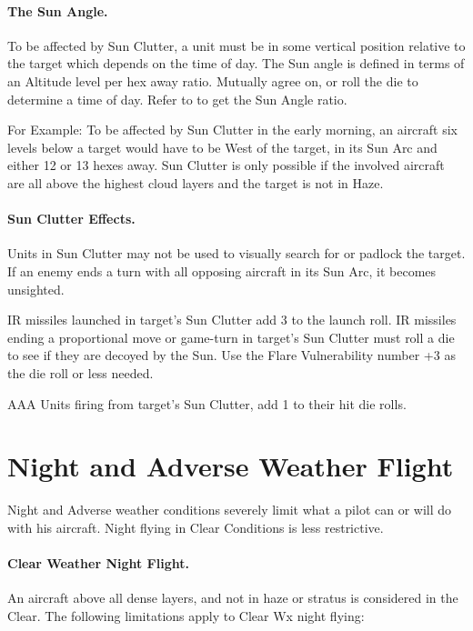 \begin{advancedrules}
\paragraph{The Sun Angle.} To be affected by Sun Clutter, a unit must be in some vertical position relative to the target which depends on the time of day. The Sun angle is defined in terms of an Altitude level per hex away ratio. Mutually agree on, or roll the die to determine a time of day. Refer to  to get the Sun Angle ratio.



For Example: To be affected by Sun Clutter in the early morning, an aircraft six levels below a target would have to be West of the target, in its Sun Arc and either 12 or 13 hexes away. Sun Clutter is only possible if the involved aircraft are all above the highest cloud layers and the target is not in Haze.

\paragraph{Sun Clutter Effects.} Units in Sun Clutter may not be used to visually search for or padlock the target. If an enemy ends a turn with all opposing aircraft in its Sun Arc, it becomes unsighted.

IR missiles launched in target's Sun Clutter add 3 to the launch roll. IR missiles ending a proportional move or game-turn in target's Sun Clutter must roll a die to see if they are decoyed by the Sun. Use the Flare Vulnerability number +3 as the die roll or less needed.

AAA Units firing from target's Sun Clutter, add 1 to their hit die rolls.

\section{Night and Adverse Weather Flight}
\label{rule:night-and-adverse-weather-flight}

Night and Adverse weather conditions severely limit what a pilot can or will do with his aircraft. Night flying in Clear Conditions is less restrictive.

\paragraph{Clear Weather Night Flight.} An aircraft above all dense layers, and not in haze or stratus is considered in the Clear. The following limitations apply to Clear Wx night flying:


\end{advancedrules}
